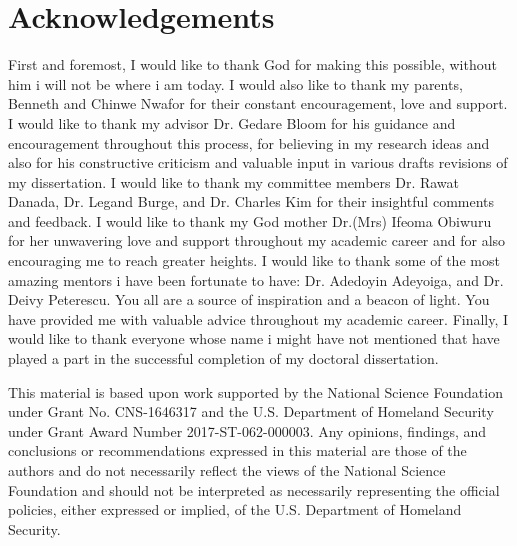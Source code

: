

\chapter*{Acknowledgements}

First and foremost, I would like to thank God for making this possible, without him i will not be where i am today. I would also like to thank my parents, Benneth and Chinwe Nwafor for their constant encouragement, love and support. I would like to thank my advisor Dr. Gedare Bloom for his guidance and encouragement throughout this process, for believing in my research ideas and also for his constructive criticism and valuable input in various drafts revisions of my dissertation. I would like to thank my committee members Dr. Rawat Danada, Dr. Legand Burge, and Dr. Charles Kim for their insightful comments and feedback. I would like to thank my God mother Dr.(Mrs) Ifeoma Obiwuru for her unwavering love and support throughout my academic career and for also encouraging me to reach greater heights. I would like to thank some of the most amazing mentors i have been fortunate to have: Dr. Adedoyin Adeyoiga, and Dr. Deivy Peterescu. You all are a source of inspiration and a beacon of light. You have provided me with valuable advice throughout my academic career. Finally, I would like to thank everyone whose name i might have not mentioned that have played a part in the successful completion of my doctoral dissertation.



This material is based upon work supported by the National Science
Foundation under Grant No. CNS-1646317 and the U.S. Department of
Homeland Security under Grant Award Number 2017-ST-062-000003. Any
opinions, findings, and conclusions or recommendations expressed in
this material are those of the authors and do not necessarily reflect
the views of the National Science Foundation and should not be
interpreted as necessarily representing the official policies, either
expressed or implied, of the U.S. Department of Homeland Security.